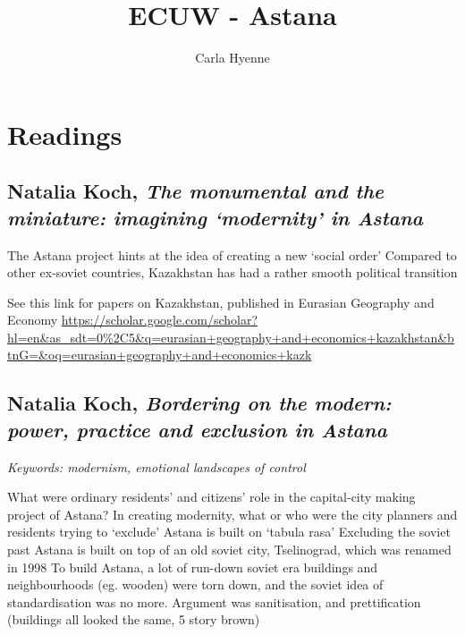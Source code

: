 \documentclass{article}
\title{ECUW - Astana}
\author{Carla Hyenne}
\begin{document}
\maketitle

\tableofcontents

\pagebreak

\section{Readings}

\subsection{Natalia Koch, \textit{The monumental and the miniature: imagining `modernity' in Astana}}\cite{koch2010monumental}

\begin{outline}
	\1 The Astana project hints at the idea of creating a new `social order'
	\1 Compared to other ex-soviet countries, Kazakhstan has had a rather smooth political transition
\end{outline}


See this link for papers on Kazakhstan, published in Eurasian Geography and Economy \url{https://scholar.google.com/scholar?hl=en&as_sdt=0%2C5&q=eurasian+geography+and+economics+kazakhstan&btnG=&oq=eurasian+geography+and+economics+kazk} 

\subsection{Natalia Koch, \textit{Bordering on the modern: power, practice and exclusion in Astana}}\cite{koch2014bordering}

\textit{Keywords: modernism, emotional landscapes of control}

\begin{outline}
	\1 What were ordinary residents' and citizens' role in the capital-city making project of Astana?
	\1 In creating modernity, what or who were the city planners and residents trying to `exclude'
	\1 Astana is built on `tabula rasa'
	\1 Excluding the soviet past
		\2 Astana is built on top of an old soviet city, Tselinograd, which was renamed in 1998
		\2 To build Astana, a lot of run-down soviet era buildings and neighbourhoods (eg. wooden) were torn down, and the soviet idea of standardisation was no more. Argument was sanitisation, and prettification (buildings all looked the same, 5 story brown)
\end{outline}
\end{document}
